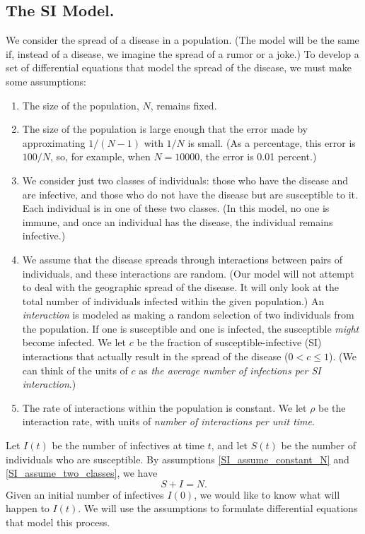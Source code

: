 \documentclass[reqno]{immbook}
\numberwithin{equation}{chapter}
\numberwithin{question}{section}
\numberwithin{theorem}{chapter}
\numberwithin{figure}{chapter}
\theoremstyle{definition}
\begin{document}
\subsection{The SI Model.}
We consider the spread of a
disease in a population.
(The model will be the same if, instead of a disease,
we imagine the spread of a rumor or a joke.)
To develop a set of differential equations that model
the spread of the disease, we must make some assumptions:
\begin{enumerate}
\item
\label{SI_assume_constant_N}
The size of the population, $N$, remains fixed.
\item
\label{SI_assume_large_N}
The size of the population is
large enough that the error made by approximating
$1/(N-1)$ with $1/N$ is small. (As a percentage,
this error is $100/N$, so, for example, when
$N=10000$, the error is 0.01 percent.)
\item
\label{SI_assume_two_classes}
We  consider just two classes
of individuals: those who have the disease and are infective,
and those who do 
not have the disease but are susceptible to it.
Each individual is in one of these two classes.
(In this model, no one is immune, and once an individual
has the disease, the individual remains infective.)
\item
\label{SI_assume_random}
We assume that the disease spreads through
interactions between pairs of individuals, and
these interactions are random.
(Our model will not attempt to deal with the geographic spread
of the disease. It will only look at the total number of
individuals infected within the given population.)
An \emph{interaction} is modeled as making a random
selection of
two individuals from the population.
If one is susceptible and one is infected, the
susceptible \emph{might} become infected.
We let $c$ be the fraction of 
susceptible-infective (SI) interactions
that actually result in the spread of the disease
($0 < c \le 1$).
(We can think of the units of $c$ as
\emph{the average number of infections
per SI interaction}.) 
\item
\label{SI_assume_const_rate}
The rate of interactions within the population is constant.
We let $\rho$ be the interaction rate, with units of
\emph{number of interactions per unit time}.
\end{enumerate}

Let $I(t)$ be the number of infectives at time $t$,
and let $S(t)$ be the number of individuals who are susceptible.
By assumptions \eqref{SI_assume_constant_N} 
and \eqref{SI_assume_two_classes}, we have
\begin{equation}
   S+I = N.
\end{equation}
Given an initial number of infectives $I(0)$, we would like
to know what will happen to $I(t)$.
We will use the assumptions to formulate differential
equations that model this process.
\end{document}
